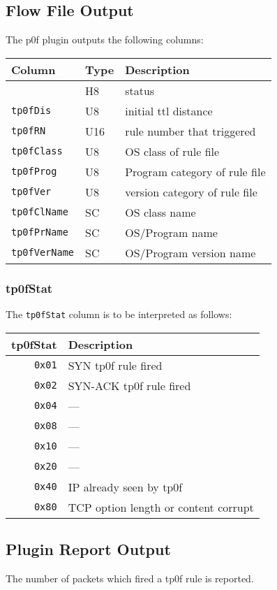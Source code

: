 \documentclass[documentation]{subfiles}
\begin{document}
\subsection{Flow File Output}
The p0f plugin outputs the following columns:
\begin{longtable}{lll}
    \toprule
    {\bf Column} & {\bf Type} & {\bf Description} \\
    \midrule\endhead%
    {\tt \nameref{tp0fStat}} & H8  & status\\
    {\tt tp0fDis}            & U8  & initial ttl distance\\
    {\tt tp0fRN}             & U16 & rule number that triggered\\
    {\tt tp0fClass}          & U8  & OS class of rule file\\
    {\tt tp0fProg}           & U8  & Program category of rule file\\
    {\tt tp0fVer}            & U8  & version category of rule file\\
    {\tt tp0fClName}         & SC  & OS class name\\
    {\tt tp0fPrName}         & SC  & OS/Program name\\
    {\tt tp0fVerName}        & SC  & OS/Program version name\\
    \bottomrule
\end{longtable}

\subsubsection{tp0fStat}\label{tp0fStat}
The {\tt tp0fStat} column is to be interpreted as follows:
\begin{longtable}{rl}
    \toprule
    {\bf tp0fStat} & {\bf Description}\\
    \midrule\endhead%
    {\tt 0x01} & SYN tp0f rule fired\\
    {\tt 0x02} & SYN-ACK tp0f rule fired\\
    {\tt 0x04} & ---\\
    {\tt 0x08} & ---\\
    {\tt 0x10} & ---\\
    {\tt 0x20} & ---\\
    {\tt 0x40} & IP already seen by tp0f\\
    {\tt 0x80} & TCP option length or content corrupt \\
    \bottomrule
\end{longtable}

\subsection{Plugin Report Output}
The number of packets which fired a tp0f rule is reported.
\end{document}

